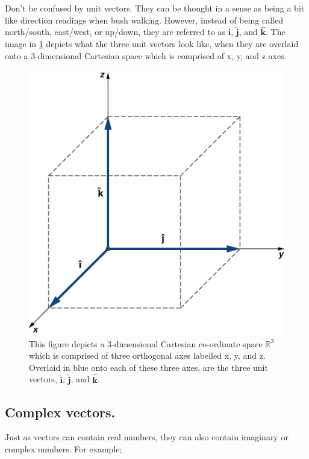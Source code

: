 \documentclass{article}
\begin{document}
Don't be confused by unit vectors. They can be thought in a sense as being a bit like direction readings when bush
walking. However, instead of being called north/south, east/west, or up/down, they are referred to as 
$\hat{\mathrm{\bm{i}}}$, $\hat{\mathrm{\bm{j}}}$, and $\hat{\mathrm{\bm{k}}}$. The image in \ref{fig:3d_axis} depicts what the three unit vectors look like, when 
they are overlaid onto a 3-dimensional Cartesian space which is comprised of x, y, and z axes.

\begin{figure}
  \includegraphics[scale=1.0]{images/3d_axis.jpg}
  \caption{This figure depicts a 3-dimensional Cartesian co-ordinate space $\mathbb{R}^3$ which is comprised
  of three orthogonal axes labelled x, y, and z. Overlaid in blue onto each of these three axes, are the three
  unit vectors, $\hat{\mathrm{\bm{i}}}$, $\hat{\mathrm{\bm{j}}}$, and $\hat{\mathrm{\bm{k}}}$.}
  \label{fig:3d_axis}
\end{figure}


\subsection{Complex vectors.}

Just as vectors can contain real numbers, they can also contain imaginary or complex numbers. For example;
\end{document}
